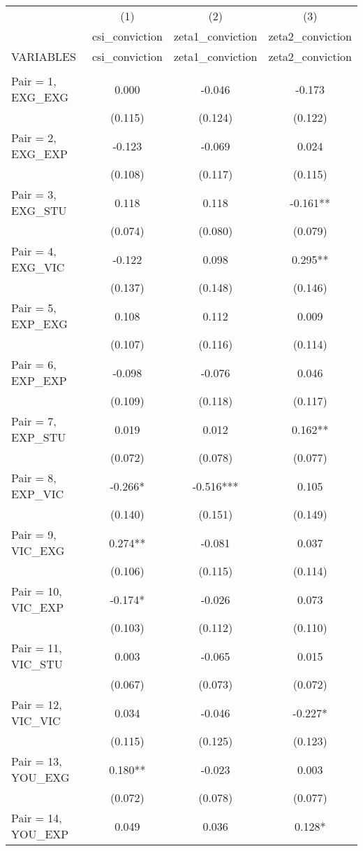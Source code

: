 \documentclass[]{article}
\begin{document}
\begin{tabular}{lccc} \hline
 & (1) & (2) & (3) \\
 & csi\_conviction & zeta1\_conviction & zeta2\_conviction \\
VARIABLES & csi\_conviction & zeta1\_conviction & zeta2\_conviction \\ \hline
 &  &  &  \\
Pair = 1, EXG\_EXG & 0.000 & -0.046 & -0.173 \\
 & (0.115) & (0.124) & (0.122) \\
Pair = 2, EXG\_EXP & -0.123 & -0.069 & 0.024 \\
 & (0.108) & (0.117) & (0.115) \\
Pair = 3, EXG\_STU & 0.118 & 0.118 & -0.161** \\
 & (0.074) & (0.080) & (0.079) \\
Pair = 4, EXG\_VIC & -0.122 & 0.098 & 0.295** \\
 & (0.137) & (0.148) & (0.146) \\
Pair = 5, EXP\_EXG & 0.108 & 0.112 & 0.009 \\
 & (0.107) & (0.116) & (0.114) \\
Pair = 6, EXP\_EXP & -0.098 & -0.076 & 0.046 \\
 & (0.109) & (0.118) & (0.117) \\
Pair = 7, EXP\_STU & 0.019 & 0.012 & 0.162** \\
 & (0.072) & (0.078) & (0.077) \\
Pair = 8, EXP\_VIC & -0.266* & -0.516*** & 0.105 \\
 & (0.140) & (0.151) & (0.149) \\
Pair = 9, VIC\_EXG & 0.274** & -0.081 & 0.037 \\
 & (0.106) & (0.115) & (0.114) \\
Pair = 10, VIC\_EXP & -0.174* & -0.026 & 0.073 \\
 & (0.103) & (0.112) & (0.110) \\
Pair = 11, VIC\_STU & 0.003 & -0.065 & 0.015 \\
 & (0.067) & (0.073) & (0.072) \\
Pair = 12, VIC\_VIC & 0.034 & -0.046 & -0.227* \\
 & (0.115) & (0.125) & (0.123) \\
Pair = 13, YOU\_EXG & 0.180** & -0.023 & 0.003 \\
 & (0.072) & (0.078) & (0.077) \\
Pair = 14, YOU\_EXP & 0.049 & 0.036 & 0.128* \\

\end{tabular}
\end{document}
